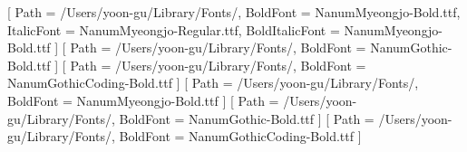 \renewcommand{\cftloftitlefont}{%
  \hfill\sffamily\bfseries\fontsize{30pt}{36pt}\selectfont\color{taInk}}
\renewcommand{\cftafterloftitle}{\hfill\par
  \vspace{2pt}{\hfill\sffamily\footnotesize\bfseries\color{taSlate}%
   FIGURES · 그림 목록\par}\vspace{14pt}}
\renewcommand{\cftlottitlefont}{%
  \hfill\sffamily\bfseries\fontsize{30pt}{36pt}\selectfont\color{taInk}}
\renewcommand{\cftafterlottitle}{\hfill\par
  \vspace{2pt}{\hfill\sffamily\footnotesize\bfseries\color{taSlate}%
   TABLES · 표 목록\par}\vspace{14pt}}

\setlength{\cftfignumwidth}{3.2em}
\renewcommand{\cftfigfont}{\sffamily\small\color{taSubtext}}
\renewcommand{\cftfigpresnum}{\ttfamily\color{taSlateMute}}
\renewcommand{\cftfigpagefont}{\ttfamily\small\color{taSubtext}}
\renewcommand{\cftfigleader}{\color{taPaperDeep}\cftdotfill{\cftfigdotsep}\color{taSubtext}}
\renewcommand{\cftfigdotsep}{2}
\setlength{\cfttabnumwidth}{3.2em}
\renewcommand{\cfttabfont}{\sffamily\small\color{taSubtext}}
\renewcommand{\cfttabpresnum}{\ttfamily\color{taSlateMute}}
\renewcommand{\cfttabpagefont}{\ttfamily\small\color{taSubtext}}
\renewcommand{\cfttableader}{\color{taPaperDeep}\cftdotfill{\cfttabdotsep}\color{taSubtext}}
\renewcommand{\cfttabdotsep}{2}

\setmainfont{NanumMyeongjo-Regular.ttf}[
  Path = /Users/yoon-gu/Library/Fonts/,
  BoldFont = NanumMyeongjo-Bold.ttf,
  ItalicFont = NanumMyeongjo-Regular.ttf,
  BoldItalicFont = NanumMyeongjo-Bold.ttf
]
\setsansfont{NanumGothic-Regular.ttf}[
  Path = /Users/yoon-gu/Library/Fonts/,
  BoldFont = NanumGothic-Bold.ttf
]
\setmonofont{NanumGothicCoding-Regular.ttf}[
  Path = /Users/yoon-gu/Library/Fonts/,
  BoldFont = NanumGothicCoding-Bold.ttf
]
[
  Path = /Users/yoon-gu/Library/Fonts/,
  BoldFont = NanumMyeongjo-Bold.ttf
]
[
  Path = /Users/yoon-gu/Library/Fonts/,
  BoldFont = NanumGothic-Bold.ttf
]
[
  Path = /Users/yoon-gu/Library/Fonts/,
  BoldFont = NanumGothicCoding-Bold.ttf
]
\AtBeginDocument{\sansmath}

